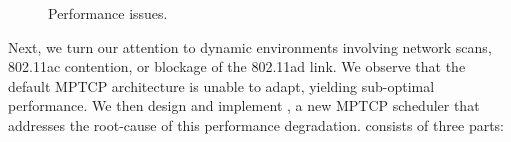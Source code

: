 \begin{figure*}[t]
    \centering
    \hfill
    \hfill
    \vspace{-0.15in}
    \caption{Performance issues.}
    \vspace{-0.1in}
\end{figure*}
\fi
\begin{comment}
\begin{figure}[t]
    \centering
    \subfigure[\emph{minRTT} vs. \emph{FixedRatio}.] {
        \texttt{[image: contention/barplot.pdf]}
        \label{fig:contention_barplot}
    }\hfill
    \subfigure[802.11ad Blockage: Improved recovery time.] {
        \texttt{[image: blockage/blockage\_fixed.pdf]}
        \label{fig:blockage_recovery}
    }
    \vspace{-0.2in}
    \caption{\name evaluation.}
    \vspace{-0.2in}
\end{figure}
\end{comment}
Next, we turn our attention to dynamic environments involving network
scans, 802.11ac contention, or blockage of the 802.11ad link. We
observe that the default MPTCP architecture is unable to adapt,
yielding sub-optimal performance.
We then design and implement \name, a new
MPTCP scheduler that addresses the root-cause of this performance
degradation. \name consists of three parts:

